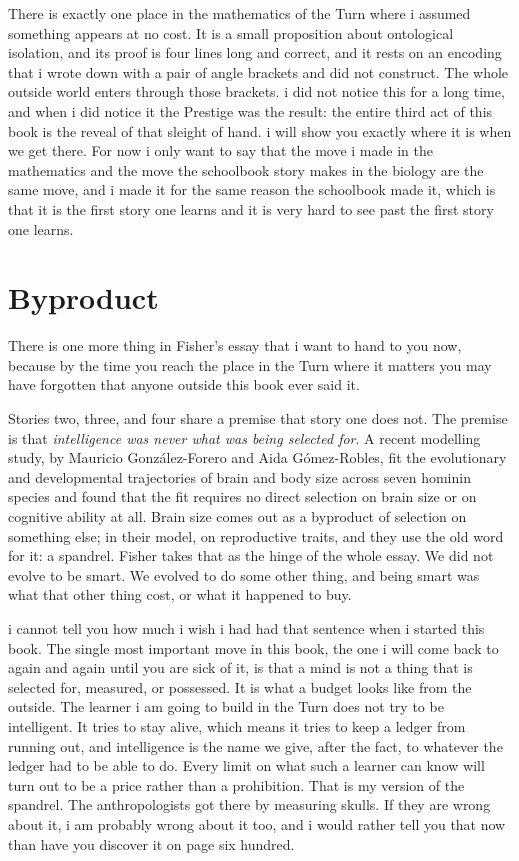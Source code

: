 There is exactly one place in the mathematics of the Turn where i assumed something appears at no cost. It is a small proposition about ontological isolation, and its proof is four lines long and correct, and it rests on an encoding that i wrote down with a pair of angle brackets and did not construct. The whole outside world enters through those brackets. i did not notice this for a long time, and when i did notice it the Prestige was the result: the entire third act of this book is the reveal of that sleight of hand. i will show you exactly where it is when we get there. For now i only want to say that the move i made in the mathematics and the move the schoolbook story makes in the biology are the same move, and i made it for the same reason the schoolbook made it, which is that it is the first story one learns and it is very hard to see past the first story one learns.

\section{Byproduct}

There is one more thing in Fisher's essay that i want to hand to you now, because by the time you reach the place in the Turn where it matters you may have forgotten that anyone outside this book ever said it.

Stories two, three, and four share a premise that story one does not. The premise is that \emph{intelligence was never what was being selected for}. A recent modelling study, by Mauricio Gonz\'alez-Forero and Aida G\'omez-Robles, fit the evolutionary and developmental trajectories of brain and body size across seven hominin species and found that the fit requires no direct selection on brain size or on cognitive ability at all. Brain size comes out as a byproduct of selection on something else; in their model, on reproductive traits, and they use the old word for it: a spandrel. Fisher takes that as the hinge of the whole essay. We did not evolve to be smart. We evolved to do some other thing, and being smart was what that other thing cost, or what it happened to buy.

i cannot tell you how much i wish i had had that sentence when i started this book. The single most important move in this book, the one i will come back to again and again until you are sick of it, is that a mind is not a thing that is selected for, measured, or possessed. It is what a budget looks like from the outside. The learner i am going to build in the Turn does not try to be intelligent. It tries to stay alive, which means it tries to keep a ledger from running out, and intelligence is the name we give, after the fact, to whatever the ledger had to be able to do. Every limit on what such a learner can know will turn out to be a price rather than a prohibition. That is my version of the spandrel. The anthropologists got there by measuring skulls. If they are wrong about it, i am probably wrong about it too, and i would rather tell you that now than have you discover it on page six hundred.

